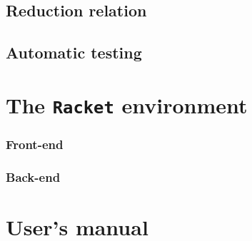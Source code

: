 \documentclass[inz, english, shortabstract]{iithesis}
\newcommand{\Racket}{\texttt{Racket} }
\begin{document}
\section{Reduction relation}

\section{Automatic testing}


\chapter{The \Racket environment}

\subsection{Front-end}

\subsection{Back-end}


\chapter{User's manual}


{}


\end{document}
